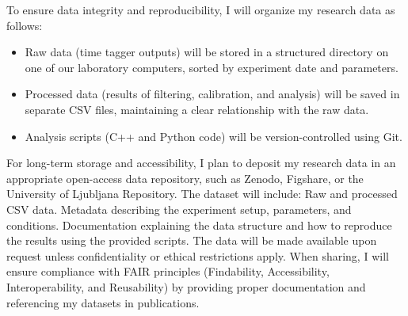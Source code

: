 \documentclass{article}
\theoremstyle{mytheoremstyle}
\theoremstyle{mytheoremstyle}
\theoremstyle{myproblemstyle}
\begin{document}
To ensure data integrity and reproducibility, I will organize my research data as follows:
\begin{itemize}
	\item Raw data (time tagger outputs) will be stored in a structured directory on one of our laboratory computers, sorted by experiment date and parameters.
	\item Processed data (results of filtering, calibration, and analysis) will be saved in separate CSV files, maintaining a clear relationship with the raw data.
	\item Analysis scripts (C++ and Python code) will be version-controlled using Git.
\end{itemize}
For long-term storage and accessibility, I plan to deposit my research data in an appropriate open-access data repository,
such as Zenodo, Figshare, or the University of Ljubljana Repository. The dataset will include:
Raw and processed CSV data.
Metadata describing the experiment setup, parameters, and conditions.
Documentation explaining the data structure and how to reproduce the results using the provided scripts.
The data will be made available upon request unless confidentiality or ethical restrictions apply.
When sharing, I will ensure compliance with FAIR principles (Findability, Accessibility,
Interoperability, and Reusability) by providing proper documentation and referencing my datasets in publications.
\newpage




\end{document}
